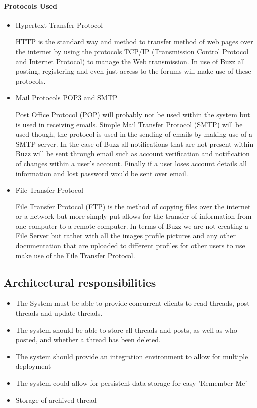 \documentclass[10pt]{article}
\begin{document}
\paragraph{Protocols Used}
\begin{itemize}
\item Hypertext Transfer Protocol

HTTP is the standard way and method to transfer method of web pages over the internet by using the protocols TCP/IP (Transmission Control Protocol and Internet Protocol) to manage the Web transmission. In use of Buzz all posting, registering and even just access to the forums will make use of these protocols.

\item Mail Protocols POP3 and SMTP

Post Office Protocol (POP) will probably not be used within the system but is used in receiving emails. Simple Mail Transfer Protocol (SMTP) will be used though, the protocol is used in the sending of emails by making use of a SMTP server. In the case of Buzz all notifications that are not present within Buzz will be sent through email such as account verification and notification of changes within a user’s account. Finally if a user loses account details all information and lost password would be sent over email.

\item File Transfer Protocol

File Transfer Protocol (FTP) is the method of copying files over the internet or a network but more simply put allows for the transfer of information from one computer to a remote computer. In terms of Buzz we are not creating a File Server but rather with all the images profile pictures and any other documentation that are uploaded to different profiles for other users to use make use of the File Transfer Protocol.

\end{itemize}




\clearpage

\subsection{Architectural responsibilities}  %
\begin{itemize}
	\item The System must be able to provide concurrent clients to read threads, post threads and update threads.
	\item The system should be able to store all threads and posts, as well as who posted, and whether a thread has been deleted.
	\item The system should provide an integration environment to allow for multiple deployment
	\item The system could allow for persistent data storage for easy 'Remember Me'
	\item Storage of archived thread
	
\end{itemize}
\clearpage
\end{document}

